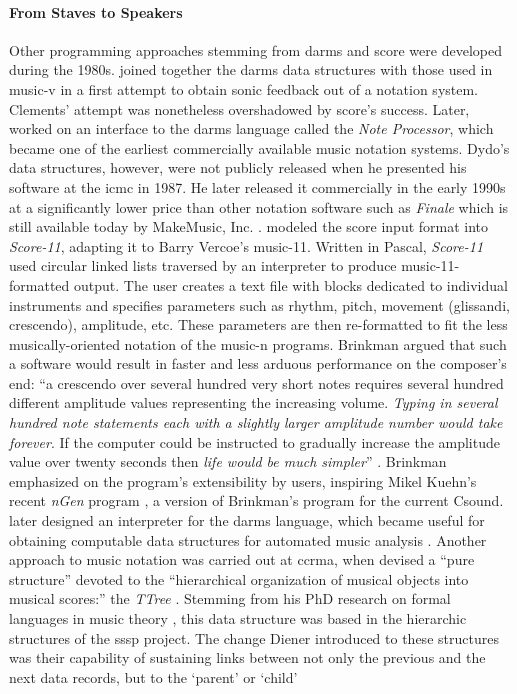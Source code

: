 \paragraph{From Staves to Speakers}
Other programming approaches stemming from \gls{darms} and \gls{score} were developed during the 1980s. \textcite{icmc/bbp2372.1980.020} joined together the \gls{darms} data structures with those used in \gls{music-v} in a first attempt to obtain sonic feedback out of a notation system. Clements' attempt was nonetheless overshadowed by \gls{score}'s success. Later, \textcite{icmc/bbp2372.1987.045} worked on an interface to the \gls{darms} language called the \textit{Note Processor}, which became one of the earliest commercially available music notation systems. Dydo's data structures, however, were not publicly released when he presented his software at the \gls{icmc} in 1987. He later released it commercially in the early 1990s at a significantly lower price than other notation software such as \textit{Finale} which is still available today by MakeMusic, Inc. \parencites{10.2307/941442}{10.2307/940555}. \textcite{icmc/bbp2372.1981.018} modeled the \gls{score} input format into \textit{Score-11}, adapting it to Barry Vercoe's \gls{music-11}. Written in Pascal, \textit{Score-11} used circular linked lists traversed by an interpreter to produce \gls{music-11}-formatted output. The user creates a text file with blocks dedicated to individual instruments and specifies parameters such as rhythm, pitch, movement (glissandi, crescendo), amplitude, etc. These parameters are then re-formatted to fit the less musically-oriented notation of the \gls{music-n} programs. Brinkman argued that such a software would result in faster and less arduous performance on the composer's end: ``a crescendo over several hundred very short notes requires several hundred different amplitude values representing the increasing volume. \textit{Typing in several hundred note statements each with a slightly larger amplitude number would take forever}. If the computer could be instructed to gradually increase the amplitude value over twenty seconds then \textit{life would be much simpler}'' \im \parencite{score11manual}. Brinkman emphasized on the program's extensibility by users, inspiring Mikel Kuehn's recent \textit{nGen} program \parencite{csoundMethods}, a version of Brinkman's program for the current Csound. \textcite{icmc/bbp2372.1983.002} later designed an interpreter for the \gls{darms} language, which became useful for obtaining computable data structures for automated music analysis \parencite{icmc/bbp2372.1984.033}. Another approach to music notation was carried out at \gls{ccrma}, when \textcites{icmc/bbp2372.1988.020}{10.2307/3680043} devised a ``pure structure'' devoted to the ``hierarchical organization of musical objects into musical scores:'' the \textit{TTree} \parencite[184]{icmc/bbp2372.1988.020}. Stemming from his PhD research on formal languages in music theory \parencite{diener1985}, this data structure was based in the hierarchic structures of the \gls{sssp} project. The change Diener introduced to these structures was their capability of sustaining links between not only the previous and the next data records, but to the `parent' or `child' 